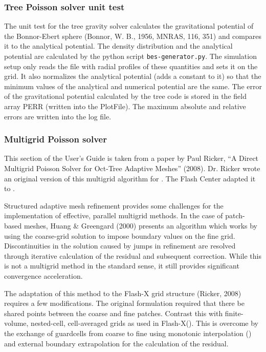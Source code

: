 \subsubsection{Tree Poisson solver unit test}

The unit test for the tree gravity solver calculates the gravitational potential
of the Bonnor-Ebert sphere (Bonnor, W. B., 1956, MNRAS, 116, 351) and compares
it to the analytical potential. The density distribution and the analytical
potential are calculated by the python script \texttt{bes-generator.py}. The
simulation setup only reads the file with radial profiles of these quantities
and sets it on the grid. It also normalizes the analytical potential (adds a
constant to it) so that the minimum values of the analytical and numerical
potential are the same. The error of the gravitational potential calculated by
the tree code is stored in the field array PERR (written into the PlotFile). The
maximum absolute and relative errors are written into the log file.




\subsubsection{Multigrid Poisson solver}
\label{Sec:GridSolversMultigrid}

This section of the  User's Guide is taken from a paper by
Paul Ricker,
``A Direct Multigrid Poisson Solver for Oct-Tree Adaptive Meshes''
 (2008).  Dr. Ricker wrote an original version of this 
multigrid algorithm for \flashx.  The Flash Center adapted it to
\flashx.

Structured adaptive mesh refinement provides some challenges for the
implementation of effective, parallel multigrid methods.  In the case of
patch-based meshes, Huang \& Greengard (2000) presents an algorithm which works by
using the coarse-grid solution to impose boundary values on the fine grid.
Discontinuities in the solution caused by jumps in refinement are resolved
through iterative calculation of the residual and subsequent correction.  While
this is not a multigrid method in the standard sense, it still provides
significant convergence acceleration.

The adaptation of this method to the Flash-X grid structure (Ricker, 2008) requires a few
modifications.  The original formulation required that there be shared points
between the coarse and fine patches.  Contrast this with finite-volume,
nested-cell, cell-averaged grids as used in Flash-X().  This is overcome by the
exchange of guardcells from coarse to fine using monotonic interpolation
() and external boundary extrapolation for the calculation of
the residual.

